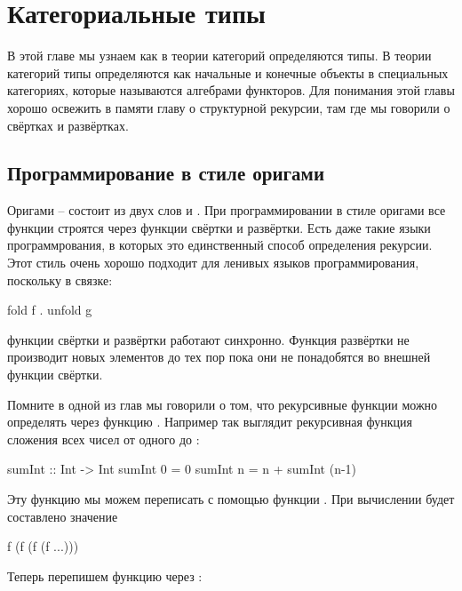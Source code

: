 \setcounter{chapter}{14}
\chapter{Категориальные типы}

В этой главе мы узнаем как в теории категорий 
определяются типы. В теории категорий типы
определяются как начальные и конечные объекты
в специальных категориях, которые называются алгебрами
функторов. Для понимания этой главы хорошо освежить в памяти
главу о структурной рекурсии, там где мы говорили
о свёртках и развёртках. 

\section{Программирование в стиле оригами}

Оригами -- состоит из двух слов  и . 
При программировании в стиле оригами все функции строятся
через функции свёртки и развёртки. Есть даже такие языки программрования,
в которых это единственный способ определения рекурсии.
Этот стиль очень хорошо подходит для ленивых языков программирования,
поскольку в связке:

\begin{code}
fold f . unfold g
\end{code}

\noindent функции свёртки и развёртки работают синхронно.
Функция развёртки не производит новых элементов до тех пор 
пока они не понадобятся во внешней функции свёртки.

Помните в одной из глав мы говорили о том, что рекурсивные
функции можно определять через функцию .  
Например так выглядит рекурсивная функция сложения всех чисел от 
одного до :

\begin{code}
sumInt :: Int -> Int
sumInt 0 = 0
sumInt n = n + sumInt (n-1)
\end{code}

Эту функцию мы можем переписать с помощью функции .
При вычислении  будет составлено значение 

\begin{code}
f (f (f (f ...)))
\end{code}

Теперь перепишем функцию  через :


